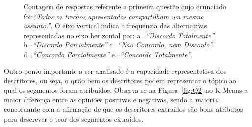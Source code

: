 \begin{figure}[!h] \centering     %

	\caption{Contagem de respostas referente a primeira questão cujo enunciado foi:\textit{``Todos os trechos apresentados compartilham um mesmo assunto.''}. O eixo vertical indica a frequência das alternativas representadas no eixo horizontal por:
		a=\textit{``Discordo Totalmente''}
		b=\textit{``Discordo Parcialmente''}
		c=\textit{``Não Concordo, nem Discordo''}
		d=\textit{``Concordo Parcialmente''}
		e=\textit{``Concordo Totalmente''}.
	}
	\label{fig:Q1}
\end{figure}



Outro ponto importante a ser analisado é a capacidade representativa dos descritores, ou seja, o quão bem os descritores podem representar o tópico ao qual os segmentos foram atribuídos. Observa-se na Figura~\ref{fig:Q2} no K-Means a maior diferença entre as opiniões positivas e negativas, sendo a maioria concordante com a afirmação de que os descritores extraídos são bons atributos para descrever o teor dos segmentos extraídos.

